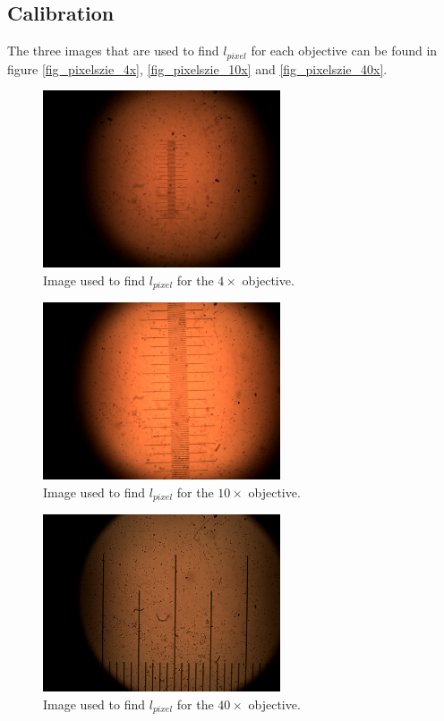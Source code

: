 \subsection{Calibration}

The three images that are used to find $l_{pixel}$ for each objective can be found in figure \ref{fig_pixelszie_4x}, \ref{fig_pixelszie_10x} and \ref{fig_pixelszie_40x}.

\begin{figure}[h!]
    \centering
    \includegraphics[width=7cm]{afbeeldingen/pixelsize/pixelsize_4x.jpg}
    \captionsetup{font=small, justification = centering}
    \caption{Image used to find $l_{pixel}$ for the $4\times$ objective.}
    \label{fig_pixelsize_4x}
\end{figure}

\begin{figure}[h!]
    \centering
    \includegraphics[width=7cm]{afbeeldingen/pixelsize/pixelsize_10x.jpg}
    \captionsetup{font=small, justification = centering}
    \caption{Image used to find $l_{pixel}$ for the $10\times$ objective.}
    \label{fig_pixelsize_10x}
\end{figure}

\begin{figure}[h!]
    \centering
    \includegraphics[width=7cm]{afbeeldingen/pixelsize/pixelsize_40x.jpg}
    \captionsetup{font=small, justification = centering}
    \caption{Image used to find $l_{pixel}$ for the $40\times$ objective.}
    \label{fig_pixelsize_40x}
\end{figure}